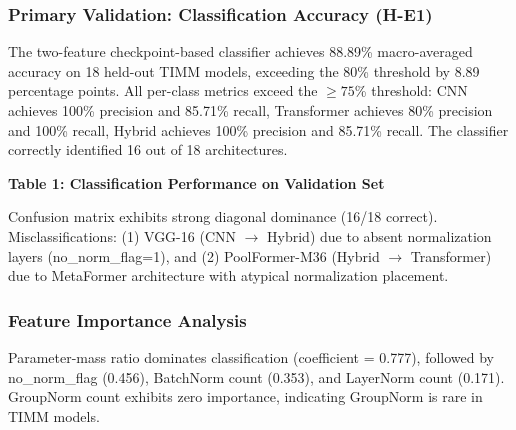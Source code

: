 
\subsubsection{Primary Validation: Classification Accuracy (H-E1)}

The two-feature checkpoint-based classifier achieves 88.89\% macro-averaged accuracy on 18 held-out TIMM models, exceeding the 80\% threshold by 8.89 percentage points. All per-class metrics exceed the $\geq 75$\% threshold: CNN achieves 100\% precision and 85.71\% recall, Transformer achieves 80\% precision and 100\% recall, Hybrid achieves 100\% precision and 85.71\% recall. The classifier correctly identified 16 out of 18 architectures.

\textbf{Table 1: Classification Performance on Validation Set}

\begin{table}[htbp]
\centering
{}
\end{table}

Confusion matrix exhibits strong diagonal dominance (16/18 correct). Misclassifications: (1) VGG-16 (CNN $\rightarrow$ Hybrid) due to absent normalization layers (no\_norm\_flag=1), and (2) PoolFormer-M36 (Hybrid $\rightarrow$ Transformer) due to MetaFormer architecture with atypical normalization placement.

\subsubsection{Feature Importance Analysis}

Parameter-mass ratio dominates classification (coefficient = 0.777), followed by no\_norm\_flag (0.456), BatchNorm count (0.353), and LayerNorm count (0.171). GroupNorm count exhibits zero importance, indicating GroupNorm is rare in TIMM models.

